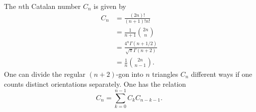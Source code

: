 \documentclass [preview, border = 20pt] {standalone}
\begin{document}
\pagecolor{black}
\color{white}
The $n$th Catalan number $C_n$ is given by
\begin{align*}
C_n &= \frac{(2n)!}{(n+1)!n!}\\
    &= \frac{1}{n+1} \binom{2n}{n}\\
    &= \frac{4^n \Gamma(n+1/2)}{\sqrt \pi \Gamma(n+2)}\\
    &= \frac{1}{n}\binom{2n}{n-1}.
\end{align*}
One can divide the regular $(n+2)$-gon into $n$ triangles $C_n$ different ways if one counts distinct orientations separately. One has the relation
\[
  C_n = \sum_{k=0}^{n-1} C_kC_{n-k-1}.
\]
\end{document}
